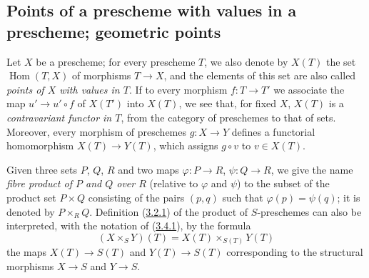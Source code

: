 \subsection{Points of a prescheme with values in a prescheme; geometric
points}
\label{subsection:I.3.4}

\begin{env}[3.4.1]
\label{I.3.4.1}
Let $X$ be a prescheme; for every prescheme $T$, we also denote by $X(T)$
the set $\operatorname{Hom}(T,X)$ of morphisms $T\to X$, and the elements of
this set are also called \emph{points of $X$ with values in $T$}. If to
every morphism $f:T\to T'$ we associate the map $u'\to u'\circ f$ of $X(T')$
into $X(T)$, we see that, for fixed $X$, $X(T)$ is a \emph{contravariant functor
in $T$}, from the category of preschemes to that of sets. Moreover,
every morphism of preschemes $g:X\to Y$ defines a functorial homomorphism
$X(T)\to Y(T)$, which assigns $g\circ v$ to $v\in X(T)$.
\end{env}

\begin{env}[3.4.2]
\label{I.3.4.2}
Given three sets $P$, $Q$, $R$ and two maps
$\varphi:P\to R$, $\psi:Q\to R$, we give the name \emph{fibre product of $P$
and $Q$ over $R$} (relative to $\varphi$ and $\psi$) to the subset of
the product set $P\times Q$ consisting of the pairs $(p,q)$ such that
$\varphi(p)=\psi(q)$; it is denoted by $P\times_R Q$. Definition
(\hyperref[I.3.2.1]{3.2.1}) of the product of $S$-preschemes can also be
interpreted, with the notation of (\hyperref[I.3.4.1]{3.4.1}), by the
formula
\[
  (X\times_S Y)(T)=X(T)\times_{S(T)}Y(T)
  \tag{3.4.2.1}
\]
the maps $X(T)\to S(T)$ and $Y(T)\to S(T)$ corresponding to the structural
morphisms $X\to S$ and $Y\to S$.
\end{env}

